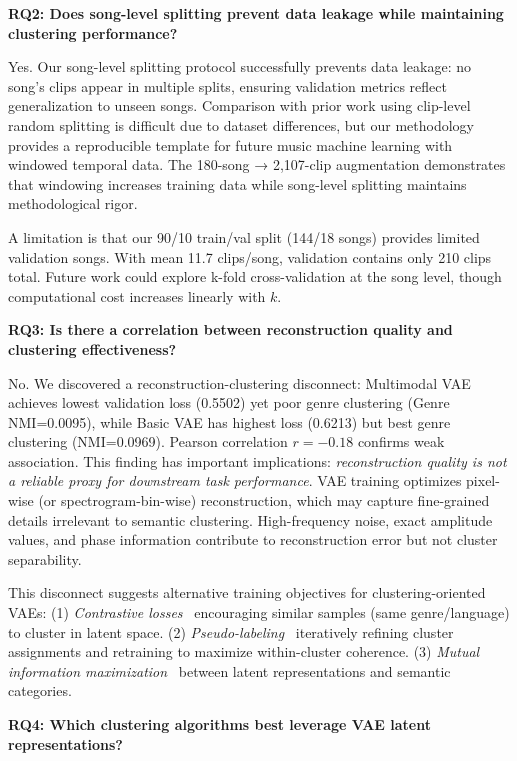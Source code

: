 \documentclass[10pt,twocolumn]{article}
\begin{document}
\textbf{RQ2: Does song-level splitting prevent data leakage while maintaining clustering performance?}

Yes. Our song-level splitting protocol successfully prevents data leakage: no song's clips appear in multiple splits, ensuring validation metrics reflect generalization to unseen songs. Comparison with prior work using clip-level random splitting is difficult due to dataset differences, but our methodology provides a reproducible template for future music machine learning with windowed temporal data. The 180-song → 2,107-clip augmentation demonstrates that windowing increases training data while song-level splitting maintains methodological rigor.

A limitation is that our 90/10 train/val split (144/18 songs) provides limited validation songs. With mean 11.7 clips/song, validation contains only 210 clips total. Future work could explore k-fold cross-validation at the song level, though computational cost increases linearly with $k$.

\textbf{RQ3: Is there a correlation between reconstruction quality and clustering effectiveness?}

No. We discovered a reconstruction-clustering disconnect: Multimodal VAE achieves lowest validation loss (0.5502) yet poor genre clustering (Genre NMI=0.0095), while Basic VAE has highest loss (0.6213) but best genre clustering (NMI=0.0969). Pearson correlation $r=-0.18$ confirms weak association. This finding has important implications: \emph{reconstruction quality is not a reliable proxy for downstream task performance}. VAE training optimizes pixel-wise (or spectrogram-bin-wise) reconstruction, which may capture fine-grained details irrelevant to semantic clustering. High-frequency noise, exact amplitude values, and phase information contribute to reconstruction error but not cluster separability.

This disconnect suggests alternative training objectives for clustering-oriented VAEs: (1) \emph{Contrastive losses}~\cite{chen2020simclr} encouraging similar samples (same genre/language) to cluster in latent space. (2) \emph{Pseudo-labeling}~\cite{lee2013pseudo} iteratively refining cluster assignments and retraining to maximize within-cluster coherence. (3) \emph{Mutual information maximization}~\cite{hjelm2019dim} between latent representations and semantic categories.

\textbf{RQ4: Which clustering algorithms best leverage VAE latent representations?}
\end{document}
